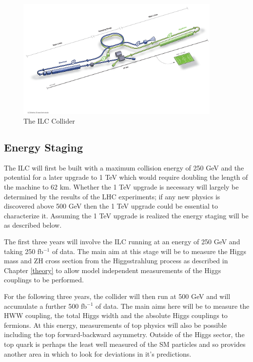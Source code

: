 \begin{figure}
  \centering
  \includegraphics[width=0.9\textwidth,keepaspectratio]{Experiments/fig/ILC}
  \caption[The ILC Experiment]{The \ac{ILC} Collider\cite{ILCTDR}}
  \label{Fig:ILC}
\end{figure}

\subsection{Energy Staging}

The \ac{ILC} will first be built with a maximum collision energy of 250 GeV and the potential for a later upgrade to 1 TeV which would require doubling the length of the machine to 62 km. Whether the 1 TeV upgrade is necessary will largely be determined by the results of the \ac{LHC} experiments; if any new physics is discovered above 500 GeV then the 1 TeV upgrade could be essential to characterize it. Assuming the 1 TeV upgrade is realized the energy staging will be as described below.

The first three years will involve the ILC running at an energy of 250 GeV and taking 250 fb${^{-1}}$ of data. The main aim at this stage will be to measure the Higgs mass and ZH cross section from the Higgsstrahlung process as described in Chapter \ref{theory} to allow model independent measurements of the Higgs couplings to be performed.

For the following three years, the collider will then run at 500 GeV and will accumulate a further 500 fb${^{-1}}$ of data. The main aims here will be to measure the HWW coupling, the total Higgs width and the absolute Higgs couplings to fermions. At this energy, measurements of top physics will also be possible including the top forward-backward asymmetry. Outside of the Higgs sector, the top quark is perhaps the least well measured of the \ac{SM} particles and so provides another area in which to look for deviations in it's predictions.

